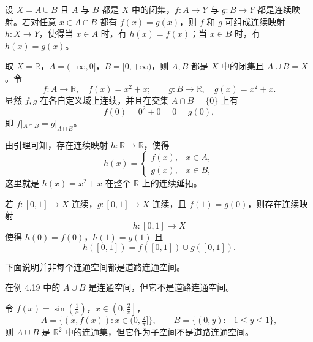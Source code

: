 \begin{lemma}[闭集上相容的连续映射可拼成整体连续映射]
设 $X=A\cup B$ 且 $A$ 与 $B$ 都是 $X$ 中的闭集，$f:A\to Y$ 与 $g:B\to Y$ 都是连续映射。若对任意 $x\in A\cap B$ 都有 $f(x)=g(x)$，则 $f$ 和 $g$ 可组成连续映射 $h:X\to Y$，使得当 $x\in A$ 时，有 $h(x)=f(x)$；当 $x\in B$ 时，有 $h(x)=g(x)$。
\end{lemma}
\begin{example}
取 $X=\mathbb{R}$，$A=(-\infty,0]$，$B=[0,+\infty)$，则 $A,B$ 都是 $X$ 中的闭集且
$A\cup B=X$。令
\[
f:A\to\mathbb{R},\quad f(x)=x^2+x;
\qquad
g:B\to\mathbb{R},\quad g(x)=x^2+x.
\]
显然 $f,g$ 在各自定义域上连续，并且在交集 $A\cap B=\{0\}$ 上有
\[
f(0)=0^2+0=0=g(0),
\]
即 $f|_{A\cap B}=g|_{A\cap B}$。

由引理可知，存在连续映射 $h:\mathbb{R}\to\mathbb{R}$，使得
\[
h(x)=
\begin{cases}
f(x), & x\in A,\\[0.3em]
g(x), & x\in B,
\end{cases}
\]
这里就是 $h(x)=x^2+x$ 在整个 $\mathbb{R}$ 上的连续延拓。
\end{example}
\begin{theorem}
若 $f:[0,1]\to X$ 连续，$g:[0,1]\to X$ 连续，且 $f(1)=g(0)$，则存在连续映射
\[
h:[0,1]\to X
\]
使得 $h(0)=f(0)$，$h(1)=g(1)$ 且
\[
h([0,1])=f([0,1])\cup g([0,1]).
\]
\end{theorem}
\begin{example}
下面说明并非每个连通空间都是道路连通空间。

在例 4.19 中的 $A\cup B$ 是连通空间，但它不是道路连通空间。

令 $f(x)=\sin\!\left(\frac{1}{x}\right)$，$x\in\left(0,\frac{2}{\pi}\right]$，
\[
A=\{(x,f(x)) : x\in(0,\tfrac{2}{\pi}]\},\qquad 
B=\{(0,y): -1\le y\le 1\},
\]
则 $A\cup B$ 是 $\mathbb{R}^2$ 中的连通集，但它作为子空间不是道路连通空间。
\end{example}